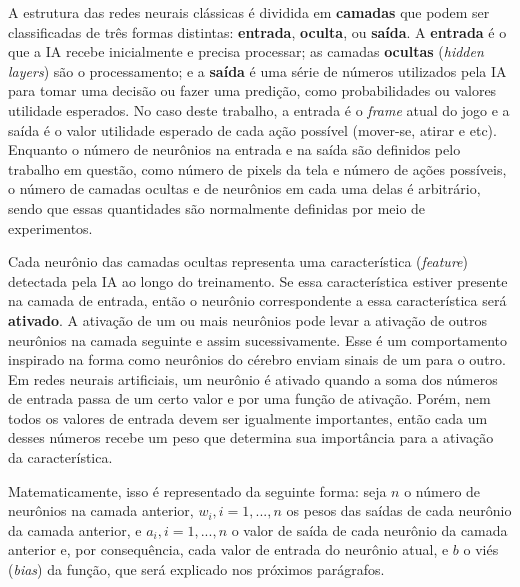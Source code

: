 A estrutura das redes neurais clássicas é dividida em \textbf{camadas} que podem ser classificadas de três formas distintas: \textbf{entrada}, \textbf{oculta}, ou \textbf{saída}.
A \textbf{entrada} é o que a IA recebe inicialmente e precisa processar; as camadas \textbf{ocultas} (\textit{hidden layers}) são o processamento; e a \textbf{saída} é uma série de números utilizados pela IA para tomar uma decisão ou fazer uma predição, como probabilidades ou valores utilidade esperados. No caso deste trabalho, a entrada é o \textit{frame} atual do jogo e a saída é o valor utilidade esperado de cada ação possível (mover-se, atirar e etc).
Enquanto o número de neurônios na entrada e na saída são definidos pelo trabalho em questão, como número de pixels da tela e número de ações possíveis, o número de camadas ocultas e de neurônios em cada uma delas é arbitrário, sendo que essas quantidades são normalmente definidas por meio de experimentos.

Cada neurônio das camadas ocultas representa uma característica (\textit{feature}) detectada pela IA ao longo do treinamento. Se essa característica estiver presente na camada de entrada, então o neurônio correspondente a essa característica será \textbf{ativado}. A ativação de um ou mais neurônios pode levar a ativação de outros neurônios na camada seguinte e assim sucessivamente. Esse é um comportamento inspirado na forma como neurônios do cérebro enviam sinais de um para o outro. Em redes neurais artificiais, um neurônio é ativado quando a soma dos números de entrada passa de um certo valor e por uma função de ativação. Porém, nem todos os valores de entrada devem ser igualmente importantes, então cada um desses números recebe um peso que determina sua importância para a ativação da característica.

Matematicamente, isso é representado da seguinte forma: seja $n$ o número de neurônios na camada anterior, $w_{i}, i = 1, ..., n$ os pesos das saídas de cada neurônio da camada anterior, e $a_{i}, i = 1, ..., n$ o valor de saída de cada neurônio da camada anterior e, por consequência, cada valor de entrada do neurônio atual, e $b$ o viés (\textit{bias}) da função, que será explicado nos próximos parágrafos.

